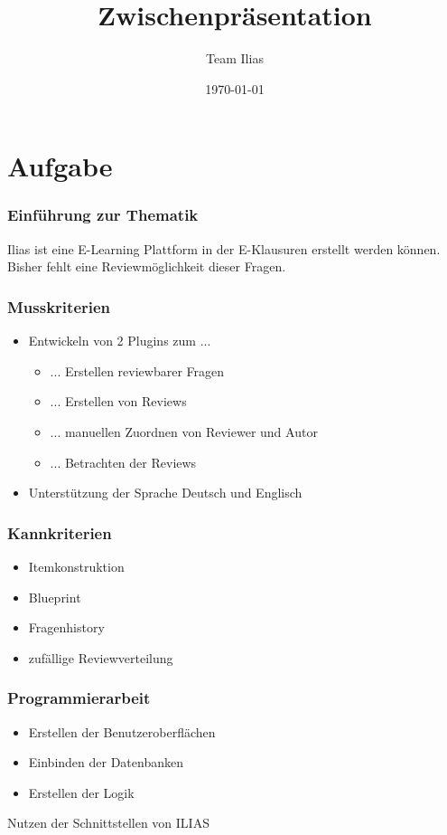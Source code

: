 \documentclass{beamer}
\title{Zwischenpräsentation}
\author{Team Ilias}
\date{\today}
\begin{document}
\maketitle
\frame{\tableofcontents[]}

 
\section{Aufgabe}
\begin{frame} %
  \frametitle{Einführung zur Thematik} %
  \begin{Überblick} %
    Ilias ist eine E-Learning Plattform in der E-Klausuren erstellt werden können.
    Bisher fehlt eine Reviewmöglichkeit dieser Fragen.
  \end{Überblick}
\end{frame}

\begin{frame} %
  \frametitle{Musskriterien} %

    \begin{itemize}
    		\item Entwickeln von 2 Plugins zum ... 
    			\begin{itemize}
    				 \item ... Erstellen reviewbarer Fragen
    				 \item ... Erstellen von Reviews
    				 \item ... manuellen Zuordnen von Reviewer und Autor
    				 \item ... Betrachten der Reviews
			\end{itemize}    			
    		\item Unterstützung der Sprache Deutsch und Englisch
    \end{itemize}
\end{frame}

\begin{frame} %
  \frametitle{Kannkriterien} %
    \begin{itemize}
    		\item Itemkonstruktion
    		\item Blueprint
    		\item Fragenhistory
    		\item zufällige Reviewverteilung
    \end{itemize}
\end{frame}

\begin{frame} %
  \frametitle{Programmierarbeit} %
  \begin{itemize}
  	\item Erstellen der Benutzeroberflächen
  	\item Einbinden der Datenbanken
  	\item Erstellen der Logik
  \end{itemize}
  \to Nutzen der Schnittstellen von ILIAS
\end{frame}
\end{document}
